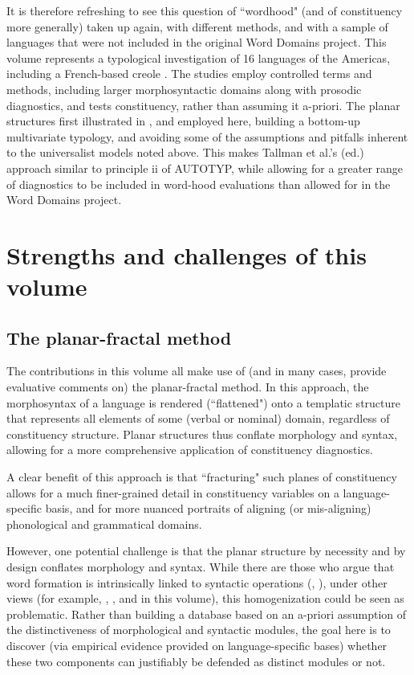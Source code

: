 \documentclass[output=paper]{langscibook}
\begin{document}
It is therefore refreshing to see this question of ``wordhood" (and of constituency more generally) taken up again, with different methods, and with a sample of languages that were not included in the original Word Domains project. This volume represents a typological investigation of 16 languages of the Americas, including a French-based creole . The studies employ controlled terms and methods, including larger morphosyntactic domains along with prosodic diagnostics, and tests constituency, rather than assuming it a-priori. The planar structures first illustrated in \citet{Tallman2021}, and employed here, building a bottom-up multivariate typology, and avoiding some of the assumptions and pitfalls inherent to the universalist models noted above. This makes Tallman et al.’s (ed.) approach similar to principle ii of AUTOTYP, while allowing for a greater range of diagnostics to be included in word-hood evaluations than allowed for in the Word Domains project.

\section{Strengths and challenges of this volume}
\subsection{The planar-fractal method}

The contributions in this volume all make use of (and in many cases, provide evaluative comments on) the planar-fractal method. In this approach, the morphosyntax of a language is rendered (``flattened") onto a templatic structure that represents all elements of some (verbal or nominal) domain, regardless of constituency structure. Planar structures thus conflate morphology and syntax, allowing for a more comprehensive application of constituency diagnostics.

A clear benefit of this approach is that ``fracturing" such planes of constituency allows for a much finer-grained detail in constituency variables on a language-specific basis, and for more nuanced portraits of aligning (or mis-aligning) phonological and grammatical domains.

However, one potential challenge is that the planar structure by necessity and by design conflates morphology and syntax. While there are those who argue that word formation is intrinsically linked to syntactic operations (\citealt{Baker1988}, \citealt{marantz_no_1997}), under other views (for example, \citealt{jackendoff_architecture_1997}, \citealt{ackema_competition_2001, ackema_morphology_2007}, and in this volume), this homogenization could be seen as problematic. Rather than building a database based on an a-priori assumption of the distinctiveness of morphological and syntactic modules, the goal here is to discover (via empirical evidence provided on language-specific bases) whether these two components can justifiably be defended as distinct modules or not.
\end{document}
